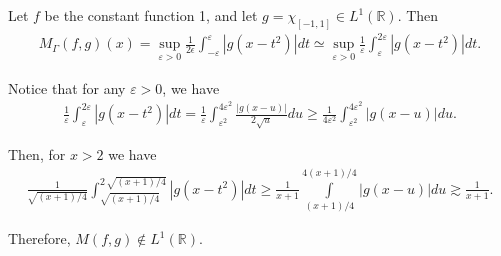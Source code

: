 \documentclass{amsart}
\newcommand{\R}{\mathbb{R}}
\newcommand{\Z}{\mathbb{Z}}
\newcommand{\e}{\varepsilon}
\theoremstyle{definition}
\theoremstyle{remark}
\numberwithin{equation}{section}
\begin{document}
Let $f$ be the constant function 1, and let $g=\chi_{[-1,1]}\in L^1(\R)$. Then
\begin{align*}
M_\Gamma(f,g)(x)=\sup_{\e>0}\frac{1}{2\epsilon}\int_{-\e}^\e|g(x-t^2)|dt \simeq %
\sup_{\e>0}\frac{1}{\e}\int_\e^{2\e} |g(x-t^2)|dt.
\end{align*}

Notice that for any $\e>0$, we have
\begin{align*}
\frac{1}{\e}\int_\e^{2\e}|g(x-t^2)|dt=\frac{1}{\e}\int_{\e^2}^{4\e^2}\frac{|g(x-u)|}{2\sqrt{u}}du\ge \frac{1}{4\e^2}\int_{\e^2}^{4\e^2}|g(x-u)|du.
\end{align*}


Then, for $x>2$ we have
\begin{align*}
\frac{1}{\sqrt{(x+1)/4}} \int_{\sqrt{(x+1)/4}}^{2\,\sqrt{(x+1)/4}}|g(x-t^2)|dt\ge \frac{1}{x+1} \int\limits_{(x+1)/4}^{4(x+1)/4}  |g(x-u)|du \gtrsim \frac{1}{x+1}.
\end{align*}

Therefore, $M(f,g) \not\in L^1(\R)$.
\end{document}
